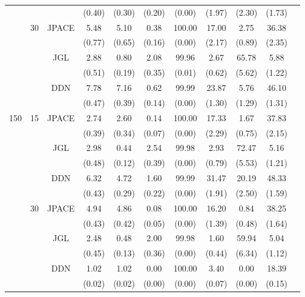 \documentclass[useAMS,usenatbib,referee]{bio}
\begin{document}
{\begin{table}[htb!]
{\begin{tabular}{||c|c|c||c|c|c|c|c|c|c||c}
 & & & (0.40) & (0.30) & (0.20) & (0.00) & (1.97) & (2.30) & (1.73) \\\cline{2-10} 
  &\multirow{6}{*}{30}  & \multirow{2}{*}{JPACE} &5.48 & 5.10 & 0.38 & 100.00 & 17.00 & 2.75 & 36.38 \\ 
& & & (0.77) & (0.65) & (0.16) & (0.00) & (2.17) & (0.89) & (2.35) \\ \cline{3-10} 
& & \multirow{2}{*}{JGL} & 2.88 & 0.80 & 2.08 & 99.96 & 2.67 & 65.78 & 5.88 \\ 
 & & & (0.51) & (0.19) & (0.35) & (0.01) & (0.62) & (5.62) & (1.22) \\ \cline{3-10} 
& & \multirow{2}{*}{DDN} & 7.78 & 7.16 & 0.62 & 99.99 & 23.87 & 5.76 & 46.10 \\ 
 & & & (0.47) & (0.39) & (0.14) & (0.00) & (1.30) & (1.29) & (1.31) \\\cline{1-10} 
\multirow{12}{*}{150}  &\multirow{6}{*}{15}  & \multirow{2}{*}{JPACE} &2.74 & 2.60 & 0.14 & 100.00 & 17.33 & 1.67 & 37.83 \\ 
& & & (0.39) & (0.34) & (0.07) & (0.00) & (2.29) & (0.75) & (2.15) \\ \cline{3-10} 
& & \multirow{2}{*}{JGL} & 2.98 & 0.44 & 2.54 & 99.98 & 2.93 & 72.47 & 5.16 \\ 
 & & & (0.48) & (0.12) & (0.39) & (0.00) & (0.79) & (5.53) & (1.21) \\ \cline{3-10} 
& & \multirow{2}{*}{DDN} & 6.32 & 4.72 & 1.60 & 99.99 & 31.47 & 20.19 & 48.33 \\ 
 & & & (0.43) & (0.29) & (0.22) & (0.00) & (1.91) & (2.50) & (1.59) \\\cline{2-10} 
  &\multirow{6}{*}{30}  & \multirow{2}{*}{JPACE} &4.94 & 4.86 & 0.08 & 100.00 & 16.20 & 0.84 & 38.25 \\ 
& & & (0.43) & (0.42) & (0.05) & (0.00) & (1.39) & (0.48) & (1.64) \\ \cline{3-10} 
& & \multirow{2}{*}{JGL} & 2.48 & 0.48 & 2.00 & 99.98 & 1.60 & 59.94 & 5.04 \\ 
 & & & (0.45) & (0.13) & (0.36) & (0.00) & (0.44) & (6.34) & (1.12) \\ \cline{3-10} 
& & \multirow{2}{*}{DDN} & 1.02 & 1.02 & 0.00 & 100.00 & 3.40 & 0.00 & 18.39 \\ 
 & & & (0.02) & (0.02) & (0.00) & (0.00) & (0.07) & (0.00) & (0.15) \\\cline{1-10} 
\end{tabular}
}
\end{table}



}
\end{document}
